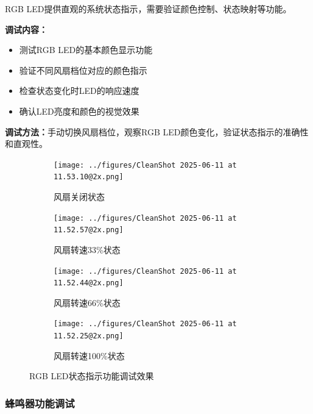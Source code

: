 \qquad RGB LED提供直观的系统状态指示，需要验证颜色控制、状态映射等功能。

\textbf{调试内容：}
\begin{itemize}
    \vspace{-6pt}
  \item 测试RGB LED的基本颜色显示功能
    \vspace{-6pt}
  \item 验证不同风扇档位对应的颜色指示
    \vspace{-6pt}
  \item 检查状态变化时LED的响应速度
    \vspace{-6pt}
  \item 确认LED亮度和颜色的视觉效果
\end{itemize}

\textbf{调试方法：}手动切换风扇档位，观察RGB LED颜色变化，验证状态指示的准确性和直观性。

\begin{figure}[H]
  \centering
  \begin{subfigure}{0.45\textwidth}
    \centering
    \texttt{[image: ../figures/CleanShot 2025-06-11 at 11.53.10@2x.png]}
    \caption{风扇关闭状态}
  \end{subfigure}
  \hfill
  \begin{subfigure}{0.45\textwidth}
    \centering
    \texttt{[image: ../figures/CleanShot 2025-06-11 at 11.52.57@2x.png]}
    \caption{风扇转速33\%状态}
  \end{subfigure}

  \vspace{1pt}

  \centering
  \begin{subfigure}{0.45\textwidth}
    \centering
    \texttt{[image: ../figures/CleanShot 2025-06-11 at 11.52.44@2x.png]}
    \caption{风扇转速66\%状态}
  \end{subfigure}
  \hfill
  \begin{subfigure}{0.45\textwidth}
    \centering
    \texttt{[image: ../figures/CleanShot 2025-06-11 at 11.52.25@2x.png]}
    \caption{风扇转速100\%状态}
  \end{subfigure}

  \caption{RGB LED状态指示功能调试效果}
  \label{fig:rgb_led_debug}
\end{figure}

\subsubsection{蜂鸣器功能调试}

